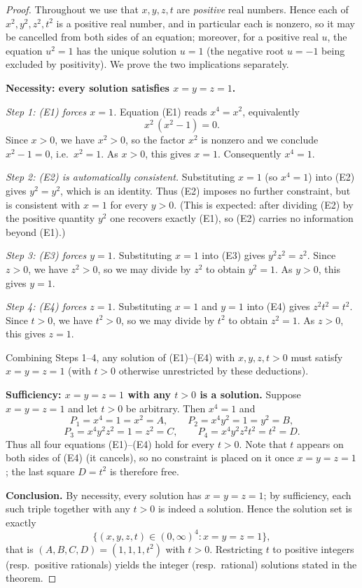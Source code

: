 \documentclass{amsart}
\begin{document}
\begin{proof}
Throughout we use that $x,y,z,t$ are \emph{positive} real numbers. Hence each of
$x^2,y^2,z^2,t^2$ is a positive real number, and in particular each is nonzero, so it
may be cancelled from both sides of an equation; moreover, for a positive real $u$,
the equation $u^2=1$ has the unique solution $u=1$ (the negative root $u=-1$ being
excluded by positivity). We prove the two implications separately.

\medskip
\noindent\textbf{Necessity: every solution satisfies $x=y=z=1$.}

\emph{Step 1: (E1) forces $x=1$.}
Equation (E1) reads $x^4=x^2$, equivalently
\[
x^2\,(x^2-1)=0 .
\]
Since $x>0$, we have $x^2>0$, so the factor $x^2$ is nonzero and we conclude
$x^2-1=0$, i.e.\ $x^2=1$. As $x>0$, this gives $x=1$. Consequently $x^4=1$.

\emph{Step 2: (E2) is automatically consistent.}
Substituting $x=1$ (so $x^4=1$) into (E2) gives $y^2=y^2$, which is an identity. Thus
(E2) imposes no further constraint, but is consistent with $x=1$ for every $y>0$.
(This is expected: after dividing (E2) by the positive quantity $y^2$ one recovers
exactly (E1), so (E2) carries no information beyond (E1).)

\emph{Step 3: (E3) forces $y=1$.}
Substituting $x=1$ into (E3) gives $y^2 z^2=z^2$. Since $z>0$, we have $z^2>0$, so we
may divide by $z^2$ to obtain $y^2=1$. As $y>0$, this gives $y=1$.

\emph{Step 4: (E4) forces $z=1$.}
Substituting $x=1$ and $y=1$ into (E4) gives $z^2 t^2=t^2$. Since $t>0$, we have
$t^2>0$, so we may divide by $t^2$ to obtain $z^2=1$. As $z>0$, this gives $z=1$.

Combining Steps 1--4, any solution of (E1)--(E4) with $x,y,z,t>0$ must satisfy
$x=y=z=1$ (with $t>0$ otherwise unrestricted by these deductions).

\medskip
\noindent\textbf{Sufficiency: $x=y=z=1$ with any $t>0$ is a solution.}
Suppose $x=y=z=1$ and let $t>0$ be arbitrary. Then $x^4=1$ and
\[
P_1=x^4=1=x^2=A,\qquad
P_2=x^4 y^2=1=y^2=B,
\]
\[
P_3=x^4 y^2 z^2=1=z^2=C,\qquad
P_4=x^4 y^2 z^2 t^2=t^2=D .
\]
Thus all four equations (E1)--(E4) hold for every $t>0$. Note that $t$ appears on both
sides of (E4) (it cancels), so no constraint is placed on it once $x=y=z=1$;
the last square $D=t^2$ is therefore free.

\medskip
\noindent\textbf{Conclusion.}
By necessity, every solution has $x=y=z=1$; by sufficiency, each such triple together
with any $t>0$ is indeed a solution. Hence the solution set is exactly
\[
\{(x,y,z,t)\in(0,\infty)^4 : x=y=z=1\},
\]
that is $(A,B,C,D)=(1,1,1,t^2)$ with $t>0$. Restricting $t$ to positive integers
(resp.\ positive rationals) yields the integer (resp.\ rational) solutions stated in
the theorem.
\end{proof}
\end{document}

